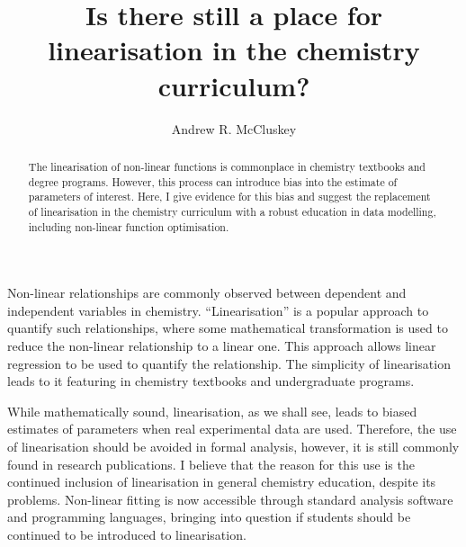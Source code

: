 \documentclass[reprint,superscriptaddress,nobibnotes,amsmath,amssymb]{revtex4-2}
\begin{document}
\title{Is there still a place for linearisation in the chemistry curriculum?}

\author{Andrew R. McCluskey}

\begin{abstract}
    The linearisation of non-linear functions is commonplace in chemistry textbooks and degree programs. 
    However, this process can introduce bias into the estimate of parameters of interest. 
    Here, I give evidence for this bias and suggest the replacement of linearisation in the chemistry curriculum with a robust education in data modelling, including non-linear function optimisation. 
\end{abstract}

\maketitle 

Non-linear relationships are commonly observed between dependent and independent variables in chemistry.
``Linearisation'' is a popular approach to quantify such relationships, where some mathematical transformation is used to reduce the non-linear relationship to a linear one. 
This approach allows linear regression to be used to quantify the relationship. 
The simplicity of linearisation leads to it featuring in chemistry textbooks \cite{monk_math_2010,atkins_physical_2018} and undergraduate programs.

While mathematically sound, linearisation, as we shall see, leads to biased estimates of parameters when real experimental data are used. 
Therefore, the use of linearisation should be avoided in formal analysis, however, it is still commonly found in research publications.
I believe that the reason for this use is the continued inclusion of linearisation in general chemistry education, despite its problems.
Non-linear fitting is now accessible through standard analysis software and programming languages, bringing into question if students should be continued to be introduced to linearisation. 
\end{document}
